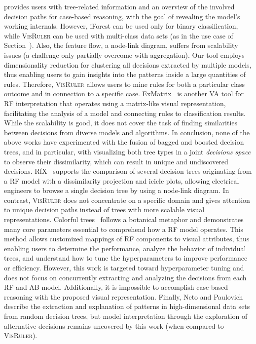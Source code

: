 provides users with tree-related information and an overview of the involved decision paths for case-based reasoning, with the goal of revealing the model's working internals. However, iForest can be used only for binary classification, while \textsc{VisRuler} can be used with multi-class data sets (as in the use case of Section~). Also, the feature flow, a node-link diagram, suffers from scalability issues (a challenge only partially overcome with aggregation). Our tool employs dimensionality reduction for clustering all decisions extracted by multiple models, thus enabling users to gain insights into the patterns inside a large quantities of rules. Therefore, \textsc{VisRuler} allows users to mine rules for both a particular class outcome and in connection to a specific case. ExMatrix~\cite{Neto2021Explainable} is another VA tool for RF interpretation that operates using a matrix-like visual representation, facilitating the analysis of a model and connecting rules to classification results. While the scalability is good, it does not cover the task of finding similarities between decisions from diverse models and algorithms. In conclusion, none of the above works have experimented with the fusion of bagged and boosted decision trees, and in particular, with visualizing both tree types in a joint \emph{decisions space} to observe their dissimilarity, which can result in unique and undiscovered decisions. RfX~\cite{Eirich2022RfX} supports the comparison of several decision trees originating from a RF model with a dissimilarity projection and icicle plots, allowing electrical engineers to browse a single decision tree by using a node-link diagram. In contrast, \textsc{VisRuler} does not concentrate on a specific domain and gives attention to unique decision paths instead of trees with more scalable visual representations. Colorful trees~\cite{Nsch2019Colorful} follows a botanical metaphor and demonstrates many core parameters essential to comprehend how a RF model operates. This method allows customized mappings of RF components to visual attributes, thus enabling users to determine the performance, analyze the behavior of individual trees, and understand how to tune the hyperparameters to improve performance or efficiency. However, this work is targeted toward hyperparameter tuning and does not focus on concurrently extracting and analyzing the decisions from each RF and AB model. Additionally, it is impossible to accomplish case-based reasoning with the proposed visual representation. Finally, Neto and Paulovich~\cite{Neto2021Multivariate} describe the extraction and explanation of patterns in high-dimensional data sets from random decision trees, but model interpretation through the exploration of alternative decisions remains uncovered by this work (when compared to \textsc{VisRuler}).

